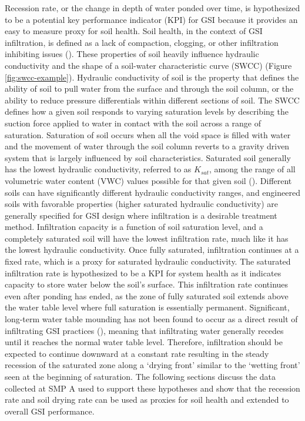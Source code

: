 Recession rate, or the change in depth of water ponded over time, is hypothesized to be a potential key performance indicator (KPI) for GSI because it provides an easy to measure proxy for soil health.
Soil health, in the context of GSI infiltration, is defined as a lack of compaction, clogging, or other infiltration inhibiting issues (\cite{Sokolovskaya2021}).
These properties of soil heavily influence hydraulic conductivity and the shape of a soil-water characteristic curve (SWCC) (Figure \ref{fig:swcc-example}).
Hydraulic conductivity of soil is the property that defines the ability of soil to pull water from the surface and through the soil column, or the ability to reduce pressure differentials within different sections of soil.
The SWCC defines how a given soil responds to varying saturation levels by describing the suction force applied to water in contact with the soil across a range of saturation.
Saturation of soil occurs when all the void space is filled with water and the movement of water through the soil column reverts to a gravity driven system that is largely influenced by soil characteristics.
Saturated soil generally has the lowest hydraulic conductivity, referred to as $K_{sat}$, among the range of all volumetric water content (VWC) values possible for that given soil (\cite{Eyo2020}).
Different soils can have significantly different hydraulic conductivity ranges, and engineered soils with favorable properties (higher saturated hydraulic conductivity) are generally specified for GSI design where infiltration is a desirable treatment method.
Infiltration capacity is a function of soil saturation level, and a completely saturated soil will have the lowest infiltration rate, much like it has the lowest hydraulic conductivity.
Once fully saturated, infiltration continues at a fixed rate, which is a proxy for saturated hydraulic conductivity.
The saturated infiltration rate is hypothesized to be a KPI for system health as it indicates capacity to store water below the soil's surface.
This infiltration rate continues even after ponding has ended, as the zone of fully saturated soil extends above the water table level where full saturation is essentially permanent.
Significant, long-term water table mounding has not been found to occur as a direct result of infiltrating GSI practices (\cite{Tu2019, Machusick2011}), meaning that infiltrating water generally recedes until it reaches the normal water table level.
Therefore, infiltration should be expected to continue downward at a constant rate resulting in the steady recession of the saturated zone along a `drying front' similar to the `wetting front' seen at the beginning of saturation.
The following sections discuss the data collected at SMP A used to support these hypotheses and show that the recession rate and soil drying rate can be used as proxies for soil health and extended to overall GSI performance.

